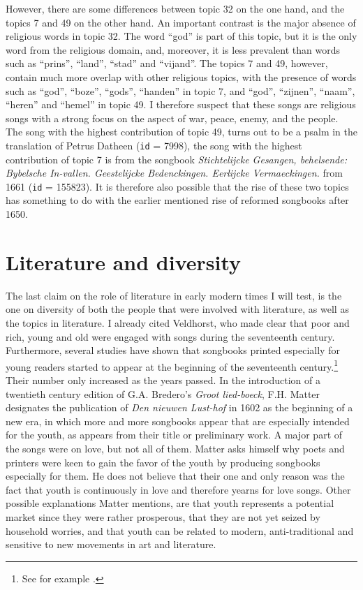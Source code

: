 However, there are some differences between topic 32 on the one hand, and the topics 7 and 49 on the other hand. An important contrast is the major absence of religious words in topic 32. The word \enquote{god} is part of this topic, but it is the only word from the religious domain, and, moreover, it is less prevalent than words such as \enquote{prins}, \enquote{land}, \enquote{stad} and \enquote{vijand}. The topics 7 and 49, however, contain much more overlap with other religious topics, with the presence of words such as \enquote{god}, \enquote{boze}, \enquote{gods}, \enquote{handen} in topic 7, and \enquote{god}, \enquote{zijnen}, \enquote{naam}, \enquote{heren} and \enquote{hemel} in topic 49. I therefore suspect that these songs are religious songs with a strong focus on the aspect of war, peace, enemy, and the people. The song with the highest contribution of topic 49, turns out to be a psalm in the translation of Petrus Datheen (\texttt{id} =  7998), the song with the highest contribution of topic 7 is from the songbook \textit{Stichtelijcke Gesangen, behelsende: Bybelsche In-vallen. Geestelijcke Bedenckingen. Eerlijcke Vermaeckingen.} from 1661 (\texttt{id} = 155823). It is therefore also possible that the rise of these two topics has something to do with the earlier mentioned rise of reformed songbooks after 1650.

\section{Literature and diversity}
The last claim on the role of literature in early modern times I will test, is the one on diversity of both the people that were involved with literature, as well as the topics in literature. I already cited Veldhorst, who made clear that poor and rich, young and old were engaged with songs during the seventeenth century.\autocite[217]{veldhorst_pharmacy_2008} Furthermore, several studies have shown that songbooks printed especially for young readers started to appear at the beginning of the seventeenth century.\footnote{See for example \autocites{stronks_dees_2014}{grootes_het_1987}.} Their number only increased as the years passed. In the introduction of a twentieth century edition of G.A. Bredero's \textit{Groot lied-boeck}, F.H. Matter designates the publication of \textit{Den nieuwen Lust-hof} in 1602 as the beginning of a new era, in which more and more songbooks appear that are especially intended for the youth, as appears from their title or preliminary work.\autocite[18]{bredero_g._1975} A major part of the songs were on love, but not all of them. Matter asks himself why poets and printers were keen to gain the favor of the youth by producing songbooks especially for them. He does not believe that their one and only reason was the fact that youth is continuously in love and therefore yearns for love songs. Other possible explanations Matter mentions, are that youth represents a potential market since they were rather prosperous, that they are not yet seized by household worries, and that youth can be related to modern, anti-traditional and sensitive to new movements in art and literature.\autocite[19]{bredero_g._1975}

